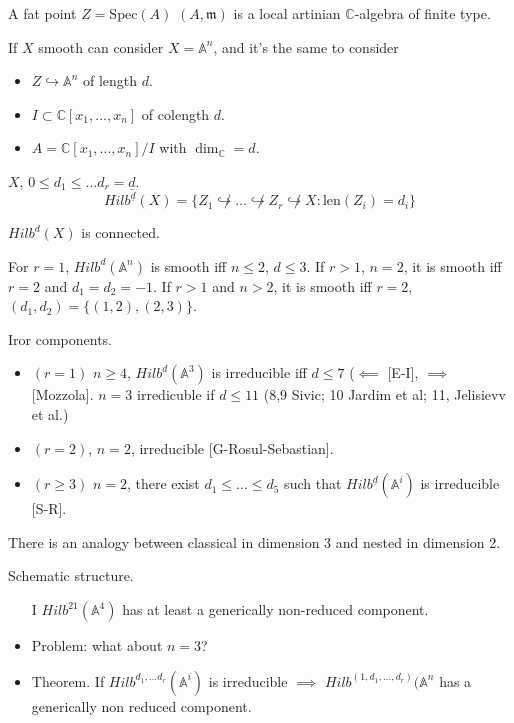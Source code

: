 A fat point $Z= \text{Spec}(A)$ $(A, \mathfrak{m})$ is a
local artinian $\mathbb{C}$-algebra of finite type.

If $X$ smooth can consider $X=\mathbb{A}^n$, and it's the same to consider
\begin{itemize}
\item $Z \hookrightarrow \mathbb{A}^n$ of length $d$.
\item $I \subset \mathbb{C}[x_1,\ldots,x_n]$ of 
colength $d$.
\item $A= \mathbb{C}[x_1,\ldots,x_n]/I$ with $\dim_\mathbb{C}=d$.
\end{itemize}

\begin{definition}
\label{definition-nested-Hilbert-scheme}
$X$, $0 \leq d_1 \leq \ldots d_r=\underline{d}$.
$$
Hilb^{\underline{d}}(X)=\{Z_1\not\hookrightarrow \ldots
\not\hookrightarrow Z_r  \not\hookrightarrow X:
\text{len}(Z_i)=d_i\}
$$
\end{definition}

\begin{theorem}[Hartshorne (r=0), Fogarty, Kalpan (r>1)]
\label{theorem-HK}
$Hilb^d(X)$ is connected.
\end{theorem}

For $r=1$, $Hilb^d(\mathbb{A}^n)$ is smooth iff
$n \leq 2$, $d \leq 3$.
If $r>1$, $n=2$, it is smooth iff $r=2$ and $d_1=d_2=-1$.
If $r>1$ and $n>2$, it is smooth iff $r=2$, $(d_1,d_2)=\{(1,2),(2,3)\}$.

Iror components.
\begin{itemize}
\item $(r=1)$ $n\geq 4$, $Hilb^d(\mathbb{A}^3)$ 
is irreducible iff $d\leq 7$ ($\impliedby$ [E-I], $\implies $ [Mozzola].
$n=3$ irredicuble if $d \leq  11$ (8,9 Sivic; 10 Jardim et al; 11, Jelisievv et
al.)
\item $(r=2)$, $n=2$, irreducible [G-Rosul-Sebastian].
\item $(r \geq 3)$ $n=2$, there exist $d_1 \leq \ldots \leq d_5$
such that $Hilb^{\underline{d}}(\mathbb{A}^i)$ is irreducible [S-R].
\end{itemize}

There is an analogy between classical in dimension 3
and nested in dimension 2. 

Schematic structure.
\begin{itemize}
\item [I] $Hilb^{21}(\mathbb{A}^4)$ has at least a generically
non-reduced component.
\item Problem: what about $n=3$?
\item Theorem. If $Hilb^{d_1,\ldots d_r}(\mathbb{A}^i)$ is
irreducible $\implies $ $Hilb^{(1,d_1,\ldots,d_r)}(\mathbb{A}^n$
has a generically non reduced component.
\end{itemize}

